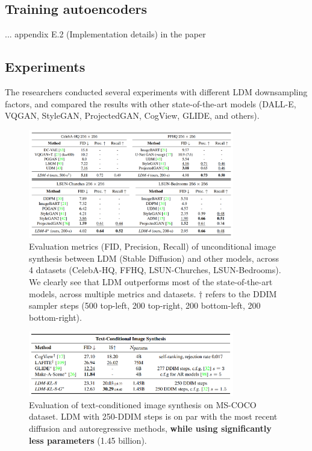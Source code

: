 \subsection{Training autoencoders}

... appendix E.2 (Implementation details) in the paper










\subsection{Experiments}

The researchers conducted several experiments with different LDM downsampling factors, and compared the results with other state-of-the-art models (DALL-E, VQGAN, StyleGAN, ProjectedGAN, CogView, GLIDE, and others).

\begin{figure}
    \centering
    \includegraphics[width=0.8\textwidth]{images/diffusion_models/stable_diffusion/experiments_1.png}
    \caption{Evaluation metrics (FID, Precision, Recall) of unconditional image synthesis between LDM (Stable Diffusion) and other models, across 4 datasets (CelebA-HQ, FFHQ, LSUN-Churches, LSUN-Bedrooms). We clearly see that LDM outperforms most of the state-of-the-art models, across multiple metrics and datasets. $\dagger$ refers to the DDIM sampler steps (500 top-left, 200 top-right, 200 bottom-left, 200 bottom-right).}
\end{figure}

\begin{figure}
    \centering
    \includegraphics[width=0.8\textwidth]{images/diffusion_models/stable_diffusion/experiments_2.png}
    \caption{Evaluation of text-conditioned image synthesis on MS-COCO dataset. LDM with 250-DDIM steps is on par with the most recent diffusion and autoregressive methods, \textbf{while using significantly less parameters} (1.45 billion).}
\end{figure}

